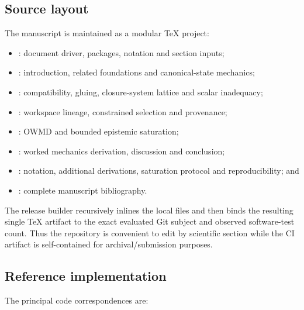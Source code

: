 \subsection{Source layout}

The manuscript is maintained as a modular TeX project:

\begin{itemize}[leftmargin=*]
\item {}: document driver, packages, notation and section inputs;
\item {}: introduction, related foundations and canonical-state mechanics;
\item {}: compatibility, gluing, closure-system lattice and scalar inadequacy;
\item {}: workspace lineage, constrained selection and provenance;
\item {}: OWMD and bounded epistemic saturation;
\item {}: worked mechanics derivation, discussion and conclusion;
\item {}: notation, additional derivations, saturation protocol and reproducibility; and
\item {}: complete manuscript bibliography.
\end{itemize}

The release builder recursively inlines the local \verb|| files and then binds the resulting single TeX artifact to the exact evaluated Git subject and observed software-test count. Thus the repository is convenient to edit by scientific section while the CI artifact is self-contained for archival/submission purposes.

\subsection{Reference implementation}

The principal code correspondences are:


